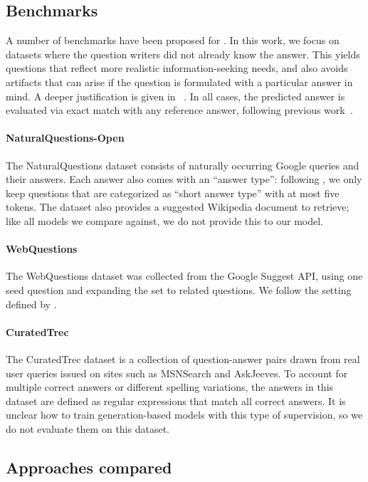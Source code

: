 \documentclass{article}
\begin{document}
\subsection{\openqa Benchmarks}
A number of benchmarks have been proposed for \openqa. In this work, we focus on datasets where the question writers did not already know the answer. This yields questions that reflect more realistic information-seeking needs, and also avoids artifacts that can arise if the question is formulated with a particular answer in mind. A deeper justification is given in ~\citet{orqa}.
In all cases, the predicted answer is evaluated via exact match with any reference answer, following previous \openqa work~\cite{drqa}.

\paragraph{NaturalQuestions-Open} The NaturalQuestions dataset \cite{naturalquestions} consists of naturally occurring Google queries and their answers. Each answer also comes with an ``answer type'': following \citet{orqa}, we only keep questions that are categorized as ``short answer type'' with at most five tokens. The dataset also provides a suggested Wikipedia document to retrieve; like all models we compare against, we do not provide this to our model.



\paragraph{WebQuestions} The WebQuestions dataset \cite{webquestions} was collected from the Google Suggest API, using one seed question and expanding the set to related questions. We follow the setting defined by \citet{drqa}.

\paragraph{CuratedTrec}
The CuratedTrec dataset is a collection of question-answer pairs drawn from real user queries issued on sites such as MSNSearch and AskJeeves. To account for multiple correct answers or different spelling variations, the answers in this dataset are defined as regular expressions that match all correct answers. It is unclear how to train generation-based models with this type of supervision, so we do not evaluate them on this dataset.

\subsection{Approaches compared}
\label{sec:comparisons}
\end{document}
